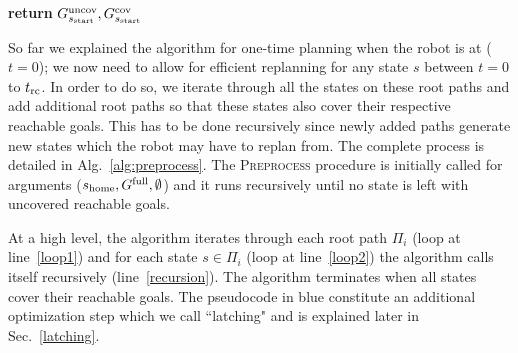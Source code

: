 \documentclass[conference]{IEEEtran}
\begin{document}
\begin{algorithm}[t]
\begin{algorithmic}[1]
 	\EndFor
\EndFor
\EndIf
\State \textbf{return} $G^{\textrm{uncov}}_{s_{\textrm{start}}}, G^{\textrm{cov}}_{s_{\textrm{start}}}$
\EndProcedure
\end{algorithmic}
\end{algorithm}

%


So far we explained the algorithm for one-time planning when the robot is at \Shome ($t = 0$); we now need to allow for efficient replanning for any state $s$ between $t = 0$ to $t_{\textrm{rc}}$. In order to do so, we iterate through all the states on these root paths and add additional root paths so that these states also cover their respective reachable goals. This has to be done recursively since newly added paths generate new states which the robot may have to replan from. The complete process is detailed in Alg.~\ref{alg:preprocess}. The \textsc{Preprocess} procedure is initially called for arguments ($s_{\textrm{home}}, G^{\textrm{full}}, \emptyset$) and it runs recursively until no state is left with uncovered reachable goals.
%

At a high level, the algorithm iterates through each root path $\Pi_i$ (loop at line~\ref{loop1}) and for each state $s \in \Pi_i$ (loop at line~\ref{loop2}) the algorithm calls itself recursively (line~\ref{recursion}). The algorithm terminates when all states cover their reachable goals. The pseudocode in blue constitute an additional optimization step which we call ``latching" and is explained later in Sec.~\ref{latching}.
%
\end{document}

